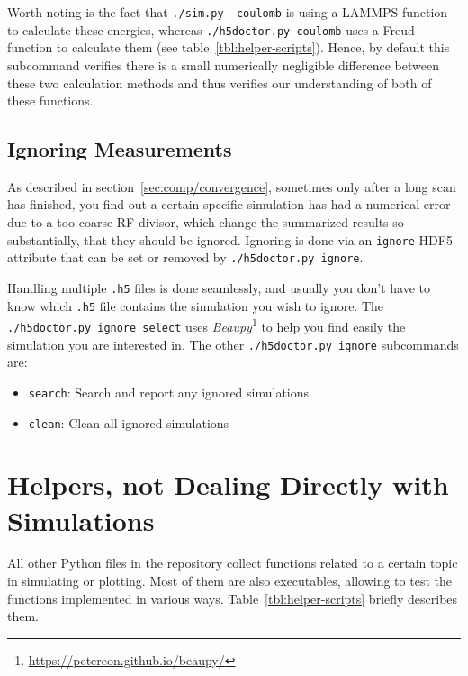 Worth noting is the fact that \texttt{./sim.py --coulomb} is using a LAMMPS\cite{LAMMPS} function to calculate these energies, whereas \texttt{./h5doctor.py coulomb} uses a Freud\cite{freud} function to calculate them (see table~\ref{tbl:helper-scripts}). Hence, by default this subcommand verifies there is a small numerically negligible difference between these two calculation methods and thus verifies our understanding of both of these functions.

\subsection{Ignoring Measurements}

As described in section~\ref{sec:comp/convergence}, sometimes only after a long scan has finished, you find out a certain specific simulation has had a numerical error due to a too coarse RF divisor, which change the summarized results so substantially, that they should be ignored. Ignoring is done via an \texttt{ignore} HDF5 attribute that can be set or removed by \texttt{./h5doctor.py ignore}.

Handling multiple \texttt{.h5} files is done seamlessly, and usually you don't have to know which \texttt{.h5} file contains the simulation you wish to ignore. The \texttt{./h5doctor.py ignore select} uses \textit{Beaupy}\footnote{\url{https://petereon.github.io/beaupy/}} to help you find easily the simulation you are interested in. The other \texttt{./h5doctor.py ignore} subcommands are:

\begin{itemize}
	\item \texttt{search}: Search and report any ignored simulations
	\item \texttt{clean}: Clean all ignored simulations
\end{itemize}

\section{Helpers, not Dealing Directly with Simulations}

All other Python files in the repository collect functions related to a certain topic in simulating or plotting. Most of them are also executables, allowing to test the functions implemented in various ways. Table~\ref{tbl:helper-scripts} briefly describes them.

